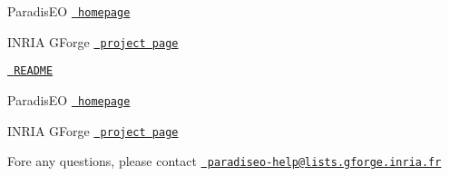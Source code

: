 
\begin{DoxyItemize}
\item Paradis\+EO \href{http://paradiseo.gforge.inria.fr}{\texttt{ homepage}}
\item I\+N\+R\+IA G\+Forge \href{http://gforge.inria.fr/projects/paradiseo/}{\texttt{ project page}}
\item \href{../../README}{\texttt{ R\+E\+A\+D\+ME}}
\item Paradis\+EO \href{http://paradiseo.gforge.inria.fr}{\texttt{ homepage}}
\item I\+N\+R\+IA G\+Forge \href{http://gforge.inria.fr/projects/paradiseo/}{\texttt{ project page}}
\item Fore any questions, please contact \href{mailto:paradiseo-help@lists.gforge.inria.fr}{\texttt{ paradiseo-\/help@lists.\+gforge.\+inria.\+fr}} 
\end{DoxyItemize}